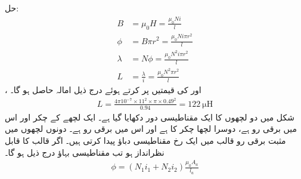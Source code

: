 حل:
\begin{align*}
B&=\mu_0 H=\frac{\mu_0 N i}{l}\\
\phi&=B  \pi r^2=\frac{\mu_0 N i \pi r^2}{l}\\ 
\lambda&=N \phi =\frac{\mu_0 N^2 i \pi r^2}{l}\\ 
L&=\frac{\lambda}{i}=\frac{\mu_0 N^2 \pi r^2}{l}
\end{align*} 
،  اور  کی قیمتیں پر کرتے ہوئے درج ذیل امالہ حاصل ہو گا۔
\begin{align*}
L=\frac{4 \pi 10^{-7} \times 11^2 \times \pi  \times 0.49^2}{0.94}=\SI{122}{\micro \henry}
\end{align*}
%
شکل  میں دو لچھوں کا ایک مقناطیسی دور دکھایا گیا ہے۔ ایک لچھے کے چکر    اور اس میں برقی رو  ہے،  دوسرا لچھا  چکر کا ہے اور اس میں برقی  رو  ہے۔ دونوں لچھوں میں مثبت برقی رو قالب میں ایک رخ  مقناطیسی دباؤ  پیدا کرتی  ہیں۔ اگر قالب کا  قابل نظرانداز ہو تب مقناطیسی بہاؤ درج ذیل ہو گا۔
\begin{align}
\phi=\left (N_1 i_1 +N_2 i_2 \right ) \frac{\mu_0 A_a}{l_a}
\end{align} 
%
